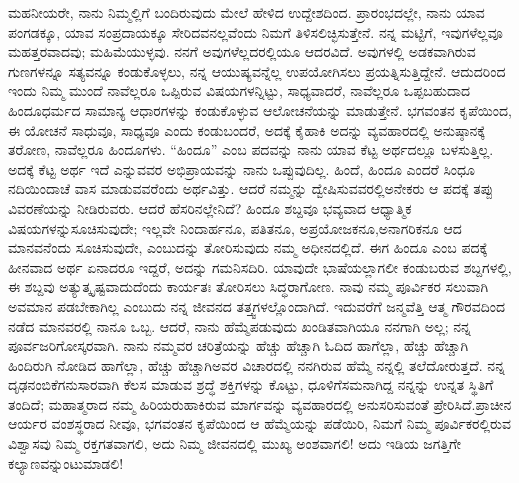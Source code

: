 ಮಹನೀಯರೇ, ನಾನು ನಿಮ್ಮಲ್ಲಿಗೆ ಬಂದಿರುವುದು ಮೇಲೆ ಹೇಳಿದ ಉದ್ದೇಶದಿಂದ. ಪ್ರಾರಂಭದಲ್ಲೇ, ನಾನು ಯಾವ ಪಂಗಡಕ್ಕೂ, ಯಾವ ಸಂಪ್ರದಾಯಕ್ಕೂ ಸೇರಿದವನಲ್ಲವೆಂದು ನಿಮಗೆ ತಿಳಿಸಲಿಚ್ಛಿಸುತ್ತೇನೆ. ನನ್ನ ಮಟ್ಟಿಗೆ, ಇವುಗಳೆಲ್ಲವೂ ಮಹತ್ತರವಾದವು; ಮಹಿಮೆಯುಳ್ಳವು. ನನಗೆ ಅವುಗಳೆಲ್ಲದರಲ್ಲಿಯೂ ಆದರವಿದೆ. ಅವುಗಳಲ್ಲಿ ಅಡಕವಾಗಿರುವ ಗುಣಗಳನ್ನೂ ಸತ್ಯವನ್ನೂ ಕಂಡುಕೊಳ್ಳಲು, ನನ್ನ ಆಯುಷ್ಯವನ್ನೆಲ್ಲ ಉಪಯೋಗಿಸಲು ಪ್ರಯತ್ನಿಸುತ್ತಿದ್ದೇನೆ. ಆದುದರಿಂದ ಇಂದು ನಿಮ್ಮ ಮುಂದೆ ನಾವೆಲ್ಲರೂ ಒಪ್ಪಿರುವ ವಿಷಯಗಳನ್ನಿಟ್ಟು, ಸಾಧ್ಯವಾದರೆ, ನಾವೆಲ್ಲರೂ ಒಪ್ಪಬಹುದಾದ ಹಿಂದೂಧರ್ಮದ ಸಾಮಾನ್ಯ ಆಧಾರಗಳನ್ನು ಕಂಡುಕೊಳ್ಳುವ ಆಲೋಚನೆಯನ್ನು ಮಾಡುತ್ತೇನೆ. ಭಗವಂತನ ಕೃಪೆಯಿಂದ, ಈ ಯೋಚನೆ ಸಾಧುವೂ, ಸಾಧ್ಯವೂ ಎಂದು ಕಂಡುಬಂದರೆ, ಅದಕ್ಕೆ ಕೈಹಾಕಿ ಅದನ್ನು ವ್ಯವಹಾರದಲ್ಲಿ ಅನುಷ್ಠಾನಕ್ಕೆ ತರೋಣ, ನಾವೆಲ್ಲರೂ ಹಿಂದೂಗಳು. “ಹಿಂದೂ” ಎಂಬ ಪದವನ್ನು ನಾನು ಯಾವ ಕೆಟ್ಟ ಅರ್ಥದಲ್ಲೂ ಬಳಸುತ್ತಿಲ್ಲ. ಅದಕ್ಕೆ ಕೆಟ್ಟ ಅರ್ಥ ಇದೆ ಎನ್ನುವವರ ಅಭಿಪ್ರಾಯವನ್ನು ನಾನು ಒಪ್ಪುವುದಿಲ್ಲ. ಹಿಂದೆ, ಹಿಂದೂ ಎಂದರೆ ಸಿಂಧೂ ನದಿಯಿಂದಾಚೆ ವಾಸ ಮಾಡುವವರೆಂದು ಅರ್ಥವಿತ್ತು. ಆದರೆ ನಮ್ಮನ್ನು ದ್ವೇಷಿಸುವವರಲ್ಲಿ\break ಅನೇಕರು ಆ ಪದಕ್ಕೆ ತಪ್ಪು ವಿವರಣೆಯನ್ನು ನೀಡಿರುವರು. ಆದರೆ ಹೆಸರಿ\-ನಲ್ಲೇನಿದೆ? ಹಿಂದೂ ಶಬ್ದವೂ ಭವ್ಯವಾದ ಆಧ್ಯಾತ್ಮಿಕ ವಿಷಯಗಳನ್ನು\break ಸೂಚಿಸು\-ವುದೇ; ಇಲ್ಲವೇ ನಿಂದಾರ್ಹನೂ, ಪತಿತನೂ, ಅಪ್ರಯೋಜಕನೂ,\break ಅನಾಗರಿಕನೂ ಆದ ಮಾನವನೆಂದು ಸೂಚಿಸುವುದೇ, ಎಂಬುದನ್ನು ತೋರಿಸುವುದು ನಮ್ಮ ಅಧೀನದಲ್ಲಿದೆ. ಈಗ ಹಿಂದೂ ಎಂಬ ಪದಕ್ಕೆ ಹೀನವಾದ ಅರ್ಥ ಏನಾದರೂ ಇದ್ದರೆ, ಅದನ್ನು ಗಮನಿಸದಿರಿ. ಯಾವುದೇ ಭಾಷೆಯಲ್ಲಾಗಲೀ ಕಂಡುಬರುವ ಶಬ್ದಗಳಲ್ಲಿ, ಈ ಶಬ್ದವು ಅತ್ಯುತ್ಕೃಷ್ಟವಾದುದೆಂದು ಕಾರ್ಯತಃ ತೋರಿಸಲು ಸಿದ್ಧರಾಗೋಣ. ನಾವು ನಮ್ಮ ಪೂರ್ವಿಕರ ಸಲುವಾಗಿ ಅವಮಾನ ಪಡಬೇಕಾಗಿಲ್ಲ ಎಂಬುದು ನನ್ನ ಜೀವನದ ತತ್ತ್ವಗಳಲ್ಲೊಂದಾಗಿದೆ. ಇದುವರೆಗೆ ಜನ್ಮವೆತ್ತಿ ಆತ್ಮ ಗೌರವದಿಂದ ನಡೆದ ಮಾನವರಲ್ಲಿ ನಾನೂ ಒಬ್ಬ. ಆದರೆ, ನಾನು ಹೆಮ್ಮೆಪಡುವುದು ಖಂಡಿತವಾಗಿಯೂ ನನಗಾಗಿ ಅಲ್ಲ; ನನ್ನ ಪೂರ್ವಜರಿಗೋಸ್ಕರವಾಗಿ. ನಾನು ನಮ್ಮವರ ಚರಿತ್ರೆಯನ್ನು ಹೆಚ್ಚು ಹೆಚ್ಚಾಗಿ ಓದಿದ ಹಾಗೆಲ್ಲಾ, ಹೆಚ್ಚು ಹೆಚ್ಚಾಗಿ ಹಿಂದಿರುಗಿ ನೋಡಿದ ಹಾಗೆಲ್ಲಾ, ಹೆಚ್ಚು ಹೆಚ್ಚಾಗಿ\break ಅವರ ವಿಚಾರದಲ್ಲಿ ನನಗಿರುವ ಹೆಮ್ಮೆ ನನ್ನಲ್ಲಿ ತಲೆದೋರುತ್ತದೆ. ನನ್ನ ದೃಢ\-ನಂಬಿಕೆಗನುಸಾರವಾಗಿ ಕೆಲಸ ಮಾಡುವ ಶ್ರದ್ಧೆ ಶಕ್ತಿಗಳನ್ನು ಕೊಟ್ಟು, ಧೂಳಿಗೆ\break ಸಮನಾಗಿದ್ದ ನನ್ನನ್ನು ಉನ್ನತ ಸ್ಥಿತಿಗೆ ತಂದಿದೆ; ಮಹಾತ್ಮರಾದ ನಮ್ಮ ಹಿರಿಯರು\break ಹಾಕಿರುವ ಮಾರ್ಗವನ್ನು ವ್ಯವಹಾರದಲ್ಲಿ ಅನುಸರಿಸುವಂತೆ ಪ್ರೇರಿಸಿದೆ.\break ಪ್ರಾಚೀನ ಆರ್ಯರ ವಂಶಸ್ಥರಾದ ನೀವೂ, ಭಗವಂತನ ಕೃಪೆಯಿಂದ ಆ ಹೆಮ್ಮೆಯನ್ನು ಪಡೆಯಿರಿ, ನಿಮಗೆ ನಿಮ್ಮ ಪೂರ್ವಿಕರಲ್ಲಿರುವ ವಿಶ್ವಾಸವು ನಿಮ್ಮ ರಕ್ತಗತವಾಗಲಿ, ಅದು ನಿಮ್ಮ ಜೀವನದಲ್ಲಿ ಮುಖ್ಯ ಅಂಶವಾಗಲಿ! ಅದು ಇಡಿಯ ಜಗತ್ತಿಗೇ ಕಲ್ಯಾಣವನ್ನುಂಟುಮಾಡಲಿ!

